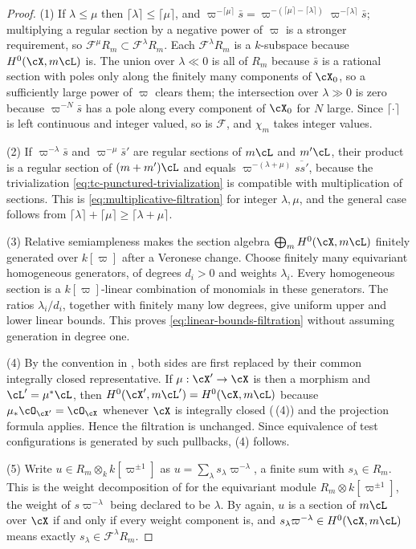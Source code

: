 \begin{proof}
(1)  If $\lambda\leq\mu$ then $\lceil\lambda\rceil\leq\lceil\mu\rceil$,
and $\varpi^{-\lceil\mu\rceil}\bar s
=\varpi^{-(\lceil\mu\rceil-\lceil\lambda\rceil)}
 \varpi^{-\lceil\lambda\rceil}\bar s$; multiplying a regular section by a
negative power of $\varpi$ is a stronger requirement, so
$\mathcal F^\mu R_m\subset\mathcal F^\lambda R_m$.  Each
$\mathcal F^\lambda R_m$ is a $k$-subspace because
$H^0(\cX,m\cL)$ is.  The union over $\lambda\ll0$ is all of $R_m$
because $\bar s$ is a rational section with poles only along the finitely
many components of $\cX_0$, so a sufficiently large power of $\varpi$
clears them; the intersection over $\lambda\gg0$ is zero because
$\varpi^{-N}\bar s$ has a pole along every component of $\cX_0$ for
$N$ large.  Since $\lceil\cdot\rceil$ is left continuous and integer
valued, so is $\mathcal F$, and $\chi_m$ takes integer values.

(2)  If $\varpi^{-\lambda}\bar s$ and $\varpi^{-\mu}\bar s'$ are regular
sections of $m\cL$ and $m'\cL$, their product is a regular section of
$(m+m')\cL$ and equals $\varpi^{-(\lambda+\mu)}\overline{ss'}$, because
the trivialization \eqref{eq:tc-punctured-trivialization} is compatible with
multiplication of sections.  This is
\eqref{eq:multiplicative-filtration} for integer $\lambda,\mu$, and the
general case follows from
$\lceil\lambda\rceil+\lceil\mu\rceil\geq\lceil\lambda+\mu\rceil$.

(3)  Relative semiampleness makes the section algebra
$\bigoplus_mH^0(\cX,m\cL)$ finitely generated over $k[\varpi]$ after a
Veronese change.  Choose finitely many equivariant homogeneous generators,
of degrees $d_i>0$ and weights $\lambda_i$.  Every homogeneous section
is a $k[\varpi]$-linear combination of monomials in these generators.
The ratios $\lambda_i/d_i$, together with finitely many low degrees, give
uniform upper and lower linear bounds.  This proves
\eqref{eq:linear-bounds-filtration} without assuming generation in degree
one.

(4)  By the convention in , both sides are
first replaced by their common integrally closed representative.  If
$\mu:\cX'\to\cX$ is then a morphism and $\cL'=\mu^\ast\cL$, then
$H^0(\cX',m\cL')=H^0(\cX,m\cL)$ because
$\mu_\ast\cO_{\cX'}=\cO_{\cX}$ whenever $\cX$ is integrally closed
(\,(4)) and the projection formula
applies.  Hence the filtration is unchanged.  Since equivalence
of test configurations is generated by such pullbacks, (4) follows.

(5)  Write $u\in R_m\otimes_kk[\varpi^{\pm1}]$ as
$u=\sum_\lambda s_\lambda\varpi^{-\lambda}$, a finite sum with
$s_\lambda\in R_m$.  This is the weight decomposition of
 for the equivariant module
$R_m\otimes k[\varpi^{\pm1}]$, the weight of $s\varpi^{-\lambda}$ being
declared to be $\lambda$.  By  again,
$u$ is a section of $m\cL$ over $\cX$ if and only if every weight
component is, and $s_\lambda\varpi^{-\lambda}\in H^0(\cX,m\cL)$ means
exactly $s_\lambda\in\mathcal F^\lambda R_m$.
\end{proof}

